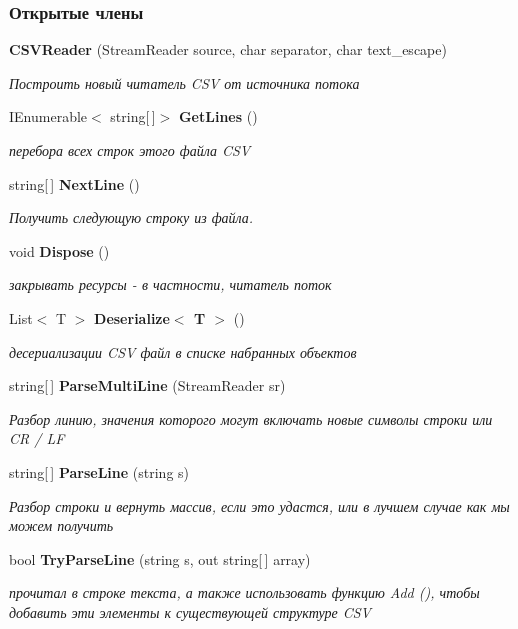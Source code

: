 \subsubsection*{Открытые члены}
\begin{DoxyCompactItemize}
\item 
{\bf C\+S\+V\+Reader} (Stream\+Reader source, char separator, char text\+\_\+escape)
\begin{DoxyCompactList}\small\item\em Построить новый читатель C\+S\+V от источника потока \end{DoxyCompactList}\item 
I\+Enumerable$<$ string[$\,$]$>$ {\bf Get\+Lines} ()
\begin{DoxyCompactList}\small\item\em перебора всех строк этого файла C\+S\+V \end{DoxyCompactList}\item 
string[$\,$] {\bf Next\+Line} ()
\begin{DoxyCompactList}\small\item\em Получить следующую строку из файла. \end{DoxyCompactList}\item 
void {\bf Dispose} ()
\begin{DoxyCompactList}\small\item\em закрывать ресурсы -\/ в частности, читатель поток \end{DoxyCompactList}\item 
List$<$ T $>$ {\bf Deserialize$<$ T $>$} ()
\begin{DoxyCompactList}\small\item\em десериализации C\+S\+V файл в списке набранных объектов \end{DoxyCompactList}\item 
string[$\,$] {\bf Parse\+Multi\+Line} (Stream\+Reader sr)
\begin{DoxyCompactList}\small\item\em Разбор линию, значения которого могут включать новые символы строки или C\+R / L\+F \end{DoxyCompactList}\item 
string[$\,$] {\bf Parse\+Line} (string s)
\begin{DoxyCompactList}\small\item\em Разбор строки и вернуть массив, если это удастся, или в лучшем случае как мы можем получить \end{DoxyCompactList}\item 
bool {\bf Try\+Parse\+Line} (string s, out string[$\,$] array)
\begin{DoxyCompactList}\small\item\em прочитал в строке текста, а также использовать функцию Add (), чтобы добавить эти элементы к существующей структуре C\+S\+V \end{DoxyCompactList}\end{DoxyCompactItemize}


